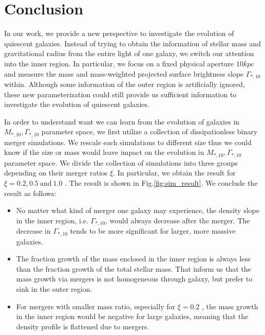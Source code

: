 \documentclass[fleqn,usenatbib]{mnras}
\begin{document}
\section{Conclusion}
In our work, we provide a new perspective to investigate the evolution of quiescent galaxies. Instead of trying to obtain the information of stellar mass and gravitational radius from the entire light of one galaxy, we switch our attention into the inner region. In particular, we focus on a fixed physical aperture $10kpc$ and measure the mass and mass-weighted projected surface brightness slope $\Gamma_{*,10}$ within. Although some information of the outer region is artificially ignored, these new parameterization could still provide us sufficient information to investigate the evolution of quiescent galaxies.
\par In order to understand want we can learn from the evolution of galaxies in $M_{*,10} ,\Gamma_{*,10}$ parameter space, we first utilize a collection of dissipationless binary merger simulations. We rescale each simulations to different size thus we could know if the size or mass would leave impact on the evolution in $M_{*,10} ,\Gamma_{*,10}$ parameter space. We divide the collection of simulations into three groups depending on their merger ratios $\xi$. In particular, we obtain the result for $\xi =  0.2, 0.5 ~\text{and}~ 1.0 $ . The result is shown in Fig.\ref{fig:sim_result}. We conclude the result as follows:
\begin{itemize}
    \item No matter what kind of merger one galaxy may experience, the density slope in the inner region, i.e. $\Gamma_{*,10}$, would always decrease after the merger. The decrease in $\Gamma_{*,10}$ tends to be more significant for larger, more massive galaxies.
    \item The fraction growth of the mass enclosed in the inner region is always less than the fraction growth of the total stellar mass. That inform us that the mass growth via mergers is not homogeneous through galaxy, but prefer to sink in the outer region.
    \item For mergers with smaller mass ratio, especially for $\xi = 0.2$ , the mass growth in the inner region would be negative for large galaxies, meaning that the density profile is flattened due to mergers. 
\end{itemize}
\end{document}
